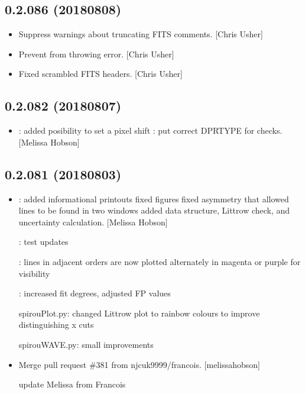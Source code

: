 \documentclass[a4paper,10pt,english]{report}
\begin{document}
\subsection{0.2.086 (2018\sphinxhyphen{}08\sphinxhyphen{}08)}
\label{\detokenize{misc/changelog:id398}}\begin{itemize}
\item {} 
Suppress warnings about truncating FITS comments. {[}Chris Usher{]}

\item {} 
Prevent  from throwing error. {[}Chris
Usher{]}

\item {} 
Fixed scrambled FITS headers. {[}Chris Usher{]}

\end{itemize}


\subsection{0.2.082 (2018\sphinxhyphen{}08\sphinxhyphen{}07)}
\label{\detokenize{misc/changelog:id399}}\begin{itemize}
\item {} 
: added posibility to set a pixel shift
: put correct DPRTYPE for  checks. {[}Melissa
Hobson{]}

\end{itemize}


\subsection{0.2.081 (2018\sphinxhyphen{}08\sphinxhyphen{}03)}
\label{\detokenize{misc/changelog:id400}}\begin{itemize}
\item {} 
: \sphinxhyphen{} added informational printouts \sphinxhyphen{} fixed
figures \sphinxhyphen{} fixed asymmetry that allowed lines to be found in two
windows \sphinxhyphen{} added  data structure, Littrow check, and
uncertainty calculation. {[}Melissa Hobson{]}

: test updates

: lines in adjacent orders are now plotted alternately in magenta or purple for visibility

: increased fit degrees, adjusted FP values

spirouPlot.py: changed Littrow plot to rainbow colours to improve distinguishing x cuts

spirouWAVE.py: small improvements

\item {} 
Merge pull request \#381 from njcuk9999/francois. {[}melissa\sphinxhyphen{}hobson{]}

update Melissa from Francois

\end{itemize}
\end{document}
